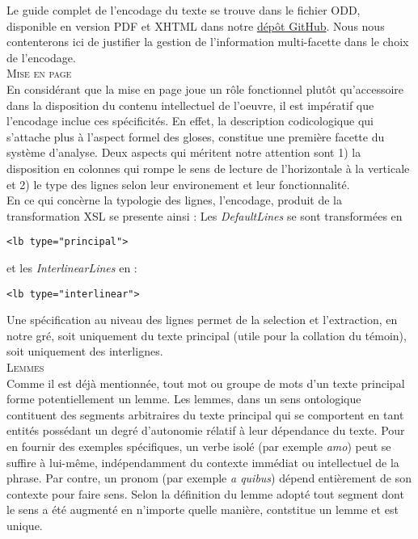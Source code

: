 \documentclass[a4paper, twoside, 12pt]{book}
\begin{document}
Le guide complet de l'encodage du texte se trouve dans le fichier ODD, disponible en version PDF et XHTML dans notre \href{https://github.com/malamatenia/Eutyches/blob/main/ODD/out/VLO41_edition_oddbyexample.pdf}{dépôt GitHub}. Nous nous contenterons ici de justifier la gestion de l'information multi-facette dans le choix de l'encodage. \\ 

\textsc{Mise en page}\\

En considérant que la mise en page joue un rôle fonctionnel plutôt qu'accessoire dans la disposition du contenu intellectuel de l'oeuvre, il est impératif que l'encodage inclue ces spécificités. En effet, la description
\og{} codicologique \fg{} qui s’attache plus à l’aspect formel des gloses, constitue une première facette du système d'analyse. Deux aspects qui méritent notre attention sont 1) la disposition en colonnes qui rompe le sens de lecture de l'horizontale à la verticale et 2) le type des lignes selon leur environement et leur fonctionnalité.\\


En ce qui concèrne la typologie des lignes, l'encodage, produit de la transformation XSL se presente ainsi : Les \textit{DefaultLines} se sont transformées en 
\begin{verbatim} 
<lb type="principal"> 
\end{verbatim}
et les \textit{InterlinearLines} en :
\begin{verbatim} 
<lb type="interlinear">
\end{verbatim}

Une spécification au niveau des lignes permet de la selection et l'extraction, en notre gré, soit uniquement du texte principal (utile pour la collation du témoin), soit uniquement des interlignes.\\


\textsc{Lemmes}\\

Comme il est déjà mentionnée, tout mot ou groupe de mots d'un texte principal forme potentiellement un lemme. Les lemmes, dans un sens ontologique contituent des segments arbitraires du texte principal qui se comportent en tant entités possédant un degré d'autonomie rélatif à leur dépendance du texte. Pour en fournir des exemples spécifiques, un verbe isolé (par exemple \textit{amo}) peut se suffire à lui-même, indépendamment du contexte immédiat ou intellectuel de la phrase. Par contre, un pronom (par exemple \textit{a quibus}) dépend entièrement de son contexte pour faire sens. Selon la définition du lemme adopté tout segment dont le sens a été augmenté en n'importe quelle manière, contstitue un lemme et est unique. \\
\end{document}
